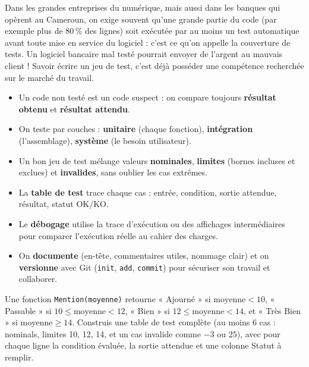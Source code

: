 \documentclass[11pt]{article}
\newcommand{\cle}[1]{{\popxbold\color{popdark}#1}}
\begin{document}
\begin{savaistu}
Dans les grandes entreprises du numérique, mais aussi dans les banques qui opèrent au Cameroun, on exige souvent qu'une grande partie du code (par exemple plus de 80\,\% des lignes) soit exécutée par au moins un test automatique avant toute mise en service du logiciel : c'est ce qu'on appelle la \cle{couverture de tests}. Un logiciel bancaire mal testé pourrait envoyer de l'argent au mauvais client ! Savoir écrire un jeu de test, c'est déjà posséder une compétence recherchée sur le marché du travail.
\end{savaistu}

\begin{aretenir}
\begin{itemize}
\item Un code non testé est un code suspect : on compare toujours \textbf{résultat obtenu} et \textbf{résultat attendu}.
\item On teste par couches : \textbf{unitaire} (chaque fonction), \textbf{intégration} (l'assemblage), \textbf{système} (le besoin utilisateur).
\item Un bon jeu de test mélange valeurs \textbf{nominales}, \textbf{limites} (bornes incluses et exclues) et \textbf{invalides}, sans oublier les cas extrêmes.
\item La \textbf{table de test} trace chaque cas : entrée, condition, sortie attendue, résultat, statut OK/KO.
\item Le \textbf{débogage} utilise la trace d'exécution ou des affichages intermédiaires pour comparer l'exécution réelle au cahier des charges.
\item On \textbf{documente} (en-tête, commentaires utiles, nommage clair) et on \textbf{versionne} avec Git (\texttt{init}, \texttt{add}, \texttt{commit}) pour sécuriser son travail et collaborer.
\end{itemize}
\end{aretenir}

\begin{exercice}
Une fonction \texttt{Mention(moyenne)} retourne « Ajourné » si $\text{moyenne} < 10$, « Passable » si $10 \le \text{moyenne} < 12$, « Bien » si $12 \le \text{moyenne} < 14$, et « Très Bien » si $\text{moyenne} \ge 14$. Construis une table de test complète (au moins 6 cas : nominals, limites 10, 12, 14, et un cas invalide comme $-3$ ou $25$), avec pour chaque ligne la condition évaluée, la sortie attendue et une colonne Statut à remplir.
\end{exercice}
\end{document}
